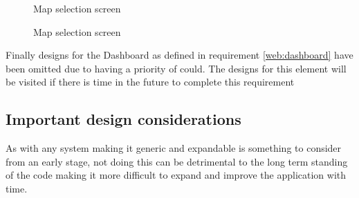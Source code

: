 \begin{figure}[h]
	\centering
	\caption{Map selection screen}
	\label{fig:webappmapsel}
\end{figure}
\begin{figure}[h]
	\centering
	\caption{Map selection screen}
	\label{fig:webappmapeditor}
\end{figure}

Finally designs for the Dashboard as defined in requirement \ref{web:dashboard} have been omitted due to having a priority of could. The designs for this element will be visited if there is time in the future to complete this requirement
\pagebreak
\subsection{Important design considerations}
As with any system making it generic and expandable is something to consider from an early stage, not doing this can be detrimental to the long term standing of the code making it more difficult to expand and improve the application with time.

